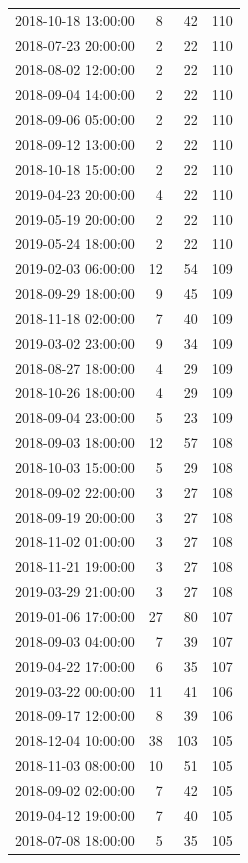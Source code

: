 \begin{tabular}{lrrr}
2018-10-18 13:00:00 & 8 & 42 & 110 \\
2018-07-23 20:00:00 & 2 & 22 & 110 \\
2018-08-02 12:00:00 & 2 & 22 & 110 \\
2018-09-04 14:00:00 & 2 & 22 & 110 \\
2018-09-06 05:00:00 & 2 & 22 & 110 \\
2018-09-12 13:00:00 & 2 & 22 & 110 \\
2018-10-18 15:00:00 & 2 & 22 & 110 \\
2019-04-23 20:00:00 & 4 & 22 & 110 \\
2019-05-19 20:00:00 & 2 & 22 & 110 \\
2019-05-24 18:00:00 & 2 & 22 & 110 \\
2019-02-03 06:00:00 & 12 & 54 & 109 \\
2018-09-29 18:00:00 & 9 & 45 & 109 \\
2018-11-18 02:00:00 & 7 & 40 & 109 \\
2019-03-02 23:00:00 & 9 & 34 & 109 \\
2018-08-27 18:00:00 & 4 & 29 & 109 \\
2018-10-26 18:00:00 & 4 & 29 & 109 \\
2018-09-04 23:00:00 & 5 & 23 & 109 \\
2018-09-03 18:00:00 & 12 & 57 & 108 \\
2018-10-03 15:00:00 & 5 & 29 & 108 \\
2018-09-02 22:00:00 & 3 & 27 & 108 \\
2018-09-19 20:00:00 & 3 & 27 & 108 \\
2018-11-02 01:00:00 & 3 & 27 & 108 \\
2018-11-21 19:00:00 & 3 & 27 & 108 \\
2019-03-29 21:00:00 & 3 & 27 & 108 \\
2019-01-06 17:00:00 & 27 & 80 & 107 \\
2018-09-03 04:00:00 & 7 & 39 & 107 \\
2019-04-22 17:00:00 & 6 & 35 & 107 \\
2019-03-22 00:00:00 & 11 & 41 & 106 \\
2018-09-17 12:00:00 & 8 & 39 & 106 \\
2018-12-04 10:00:00 & 38 & 103 & 105 \\
2018-11-03 08:00:00 & 10 & 51 & 105 \\
2018-09-02 02:00:00 & 7 & 42 & 105 \\
2019-04-12 19:00:00 & 7 & 40 & 105 \\
2018-07-08 18:00:00 & 5 & 35 & 105 \\

\end{tabular}
